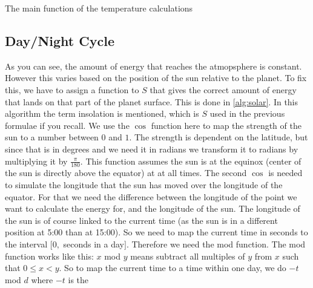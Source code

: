 \begin{algorithm}[hbt]
    \SetAlgoLined
    \caption{The main function of the temperature calculations}
    \label{alg:stream1v1}
\end{algorithm}

\subsection{Day/Night Cycle} \label{sec:daynight}
As you can see, the amount of energy that reaches the atmopsphere is constant. However this varies based on the position of the sun relative to the planet. To fix this, we have to assign a 
function to $S$ that gives the correct amount of energy that lands on that part of the planet surface. This is done in \autoref{alg:solar}. In this algorithm the term insolation is mentioned, 
which is $S$ used in the previous formulae if you recall. We use the $\cos$ function here to map the strength of the sun to a number between $0$ and $1$. The strength is dependent on the latitude, 
but since that is in degrees and we need it in radians we transform it to radians by multiplying it by $\frac{\pi}{180}$. This function assumes the sun is at the equinox (center of the sun is 
directly above the equator) \cite{equinox} at at all times. The second $\cos$ is needed to simulate the longitude that the sun has moved over the longitude of the equator. For that we need the 
difference between the longitude of the point we want to calculate the energy for, and the longitude of the sun. The longitude of the sun is of course linked to the current time (as the sun is 
in a different position at 5:00 than at 15:00). So we need to map the current time in seconds to the interval $[0,$ seconds in a day$]$. Therefore we need the mod function. The mod function 
works like this: $x$ mod $y$ means subtract all multiples of $y$ from $x$ such that $0 \leq x < y$. So to map the current time to a time within one day, we do $-t$ mod $d$ where $-t$ is the 
